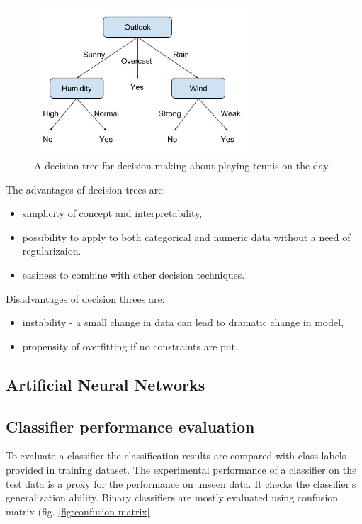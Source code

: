 \begin{figure}[h]
    \centering
    \includegraphics[width=8cm]{Images/Decision-tree.png}
    \caption{A decision tree for decision making about playing tennis on the day.}
    \label{fig:decision-tree}
\end{figure}

The advantages of decision trees are:
\begin{itemize}
	\item simplicity of concept and interpretability,
	\item possibility to apply to both categorical and numeric data without a need of regularizaion. 
	\item easiness to combine with other decision techniques.
\end{itemize}

Disadvantages of decision threes are:
\begin{itemize}
	\item instability - a small change in data can lead to dramatic change in model,
	\item propensity of overfitting if no constraints are put.
\end{itemize}


\subsection{Artificial Neural Networks}

\subsection{Classifier performance evaluation}

To evaluate a classifier the classification results are compared with class labels provided in training dataset. The experimental performance of a classifier on the test data is a proxy for the performance on unseen data. It checks the classifier’s generalization ability.
Binary classifiers are mostly evaluated using confusion matrix (fig. \ref{fig:confusion-matrix}

